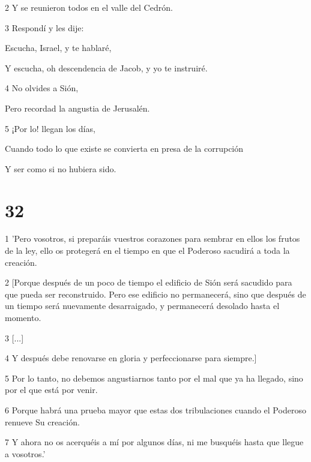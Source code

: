 \par 2 Y se reunieron todos en el valle del Cedrón.

\par 3 Respondí y les dije:

\par Escucha, Israel, y te hablaré,

\par Y escucha, oh descendencia de Jacob, y yo te instruiré.

\par 4 No olvides a Sión,

\par Pero recordad la angustia de Jerusalén.

\par 5 ¡Por lo! llegan los días,

\par Cuando todo lo que existe se convierta en presa de la corrupción

\par Y ser como si no hubiera sido.

\chapter{32}

\par 1 'Pero vosotros, si preparáis vuestros corazones para sembrar en ellos los frutos de la ley, ello os protegerá en el tiempo en que el Poderoso sacudirá a toda la creación.

\par 2 [Porque después de un poco de tiempo el edificio de Sión será sacudido para que pueda ser reconstruido. Pero ese edificio no permanecerá, sino que después de un tiempo será nuevamente desarraigado, y permanecerá desolado hasta el momento.

\par 3 [...]

\par 4 Y después debe renovarse en gloria y perfeccionarse para siempre.]

\par 5 Por lo tanto, no debemos angustiarnos tanto por el mal que ya ha llegado, sino por el que está por venir.

\par 6 Porque habrá una prueba mayor que estas dos tribulaciones cuando el Poderoso renueve Su creación.

\par 7 Y ahora no os acerquéis a mí por algunos días, ni me busquéis hasta que llegue a vosotros.'

